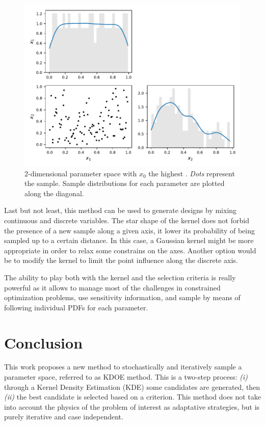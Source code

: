 \begin{figure}[!ht]
\centering
\includegraphics[width=0.9\linewidth,keepaspectratio]{fig/contributions/doe/kde_sensitivity.pdf}
\caption{2-dimensional parameter space with $x_0$ the highest . \emph{Dots} represent the sample. Sample distributions for each parameter are plotted along the diagonal.}
\label{fig:sensitivity}
\end{figure}

Last but not least, this method can be used to generate designs by mixing continuous and discrete variables. The star shape of the kernel does not forbid the presence of a new sample along a given axis, it lower its probability of being sampled up to a certain distance. In this case, a Gaussian kernel might be more appropriate in order to relax some constrains on the axes. Another option would be to modify the kernel to limit the point influence along the discrete axis.

The ability to play both with the kernel and the selection criteria is really powerful as it allows to manage most of the challenges in constrained optimization problems, use sensitivity information, and sample by means of following individual PDFs for each parameter.

\section{Conclusion}
This work proposes a new method to stochastically and iteratively sample a parameter space, referred to as KDOE method. This is a two-step process: \emph{(i)} through a Kernel Density Estimation (KDE) some candidates are generated, then \emph{(ii)} the best candidate is selected based on a criterion. This method does not take into account the physics of the problem of interest as adaptative strategies, but is purely iterative and case independent.

